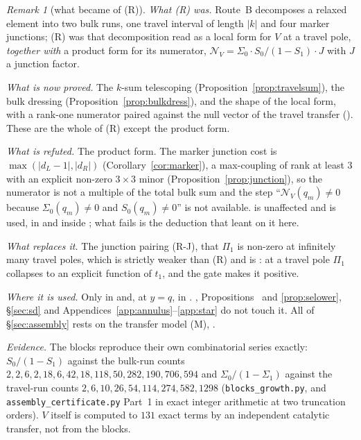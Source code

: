 \documentclass[11pt]{article}
\theoremstyle{plain}
\theoremstyle{definition}
\theoremstyle{remark}
\newtheorem{remark}[theorem]{Remark}
\begin{document}
\begin{remark}[what became of \textup{(R)}]\label{rem:Rstatus}
\emph{What \textup{(R)} was.} Route~B decomposes a relaxed element into two bulk runs, one travel
interval of length $|k|$ and four marker junctions; \textup{(R)} was that decomposition read as a
local form for $V$ at a travel pole, \emph{together with} a product form for its numerator,
$\mathcal N_V=\Sigma_0\cdot S_0/(1-S_1)\cdot J$ with $J$ a junction factor.

\emph{What is now proved.} The $k$-sum telescoping (Proposition~\ref{prop:travelsum}), the bulk
dressing (Proposition~\ref{prop:bulkdress}), and the shape of the local form, with a rank-one
numerator paired against the null vector of the travel transfer
({\cite[Proposition ``the shape of the local form'', \textup{prop:shape}]{Bonfioli2026bA}}). These are the whole of \textup{(R)} except the product form.

\emph{What is refuted.} The product form. The marker junction cost is
$\max(|d_L-1|,|d_R|)$ (Corollary~\ref{cor:marker}), a max-coupling of rank at least $3$ with an explicit non-zero $3\times3$
minor (Proposition~\ref{prop:junction}), so the numerator is not a multiple of the total bulk sum
and the step ``$\mathcal N_V(q_m)\ne0$ because $\Sigma_0(q_m)\ne0$ and $S_0(q_m)\ne0$'' is not
available. {\cite[Proposition ``the numerators do not vanish at the travel poles'', \textup{prop:numnonvanish}]{Bonfioli2026bA}} is unaffected and is used, in
{\cite[Theorem ``the travel resolvent'', \textup{thm:travelres}]{Bonfioli2026bA}} and inside {\cite[Proposition ``the shape of the local form'', \textup{prop:shape}]{Bonfioli2026bA}}; what fails is the deduction
that leant on it here.

\emph{What replaces it.} The junction pairing \textup{(R-J)}, that $\Pi_1$ is non-zero at
infinitely many travel poles, which is strictly weaker than \textup{(R)} and is
{\cite[Theorem ``closed form of the junction pairing'', \textup{thm:RJ}]{Bonfioli2026bA}}: at a travel pole $\Pi_1$ collapses to an explicit function of $t_1$, and the
gate makes it positive.

\emph{Where it is used.} Only in {\cite[Theorem \textup{thm:V}]{Bonfioli2026bA}} and, at $y=q$, in {\cite[Theorem \textup{thm:U}]{Bonfioli2026bA}}.
{\cite[Theorem ``the travel resolvent'', \textup{thm:travelres}]{Bonfioli2026bA}}, Propositions~{\cite[\textup{prop:numnonvanish}]{Bonfioli2026bA}} and \ref{prop:selower},
\S\ref{sec:sd} and Appendices~\ref{app:annulus}--\ref{app:star} do not touch it. All of
\S\ref{sec:assembly} rests on the transfer model \textup{(M)}, {\cite[Theorem ``the transfer model \textup{(M)}'', \textup{thm:model}]{Bonfioli2026bA}}.

\emph{Evidence.} The blocks reproduce their own combinatorial series exactly: $S_0/(1-S_1)$
against the bulk-run counts $2,2,6,2,18,6,42,18,118,50,282,190,706,594$ and
$\Sigma_0/(1-\Sigma_1)$ against the travel-run counts $2,6,10,26,54,114,274,582,1298$
(\texttt{blocks\_growth.py}, and \texttt{assembly\_certificate.py} Part~1 in exact integer
arithmetic at two truncation orders). $V$ itself is computed to $131$ exact terms by an
independent catalytic transfer, not from the blocks.
\end{remark}
\end{document}
